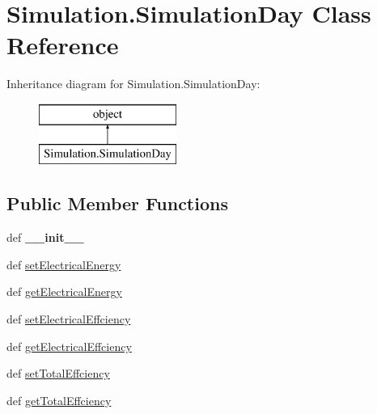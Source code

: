 \hypertarget{class_simulation_1_1_simulation_day}{\section{Simulation.\-Simulation\-Day Class Reference}
\label{class_simulation_1_1_simulation_day}
}
Inheritance diagram for Simulation.\-Simulation\-Day\-:\begin{figure}[H]
\begin{center}
\leavevmode
\includegraphics[height=2.000000cm]{class_simulation_1_1_simulation_day}
\end{center}
\end{figure}
\subsection*{Public Member Functions}
\begin{DoxyCompactItemize}
\item 
\hypertarget{class_simulation_1_1_simulation_day_a19045de3bf85bb993297fcc31332f449}{def {\bfseries \-\_\-\-\_\-init\-\_\-\-\_\-}}\label{class_simulation_1_1_simulation_day_a19045de3bf85bb993297fcc31332f449}

\item 
def \hyperlink{class_simulation_1_1_simulation_day_a8ddba8f0ee79f85075cc278de027c12c}{set\-Electrical\-Energy}
\item 
def \hyperlink{class_simulation_1_1_simulation_day_af07e53f3106b2a1475af2f93d3e0a1c2}{get\-Electrical\-Energy}
\item 
def \hyperlink{class_simulation_1_1_simulation_day_a23b6399de7d61dbac31dbe58d62dd917}{set\-Electrical\-Effciency}
\item 
def \hyperlink{class_simulation_1_1_simulation_day_a5a2af2e8fefdb9b0c8801aa26232f8b0}{get\-Electrical\-Effciency}
\item 
def \hyperlink{class_simulation_1_1_simulation_day_a8806d8cc5f8a26aa0cb560265281a5f7}{set\-Total\-Effciency}
\item 
def \hyperlink{class_simulation_1_1_simulation_day_ad3ba52c5d341705cc388c42fad49905b}{get\-Total\-Effciency}
\end{DoxyCompactItemize}
